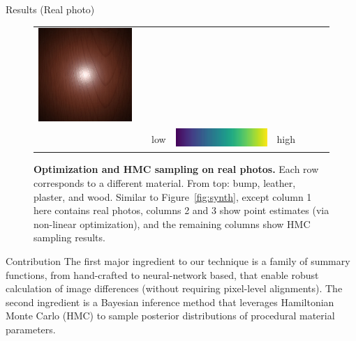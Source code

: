 \documentclass[final]{beamer}
\newlength{\twocolwid}
\newlength{\resultwidth}
\begin{document}
\begin{frame}[t]
\begin{columns}[t]
\begin{column}{\twocolwid}
\begin{block}{Results (Real photo)}
\begin{figure}[t]
\begin{tabular}{ccrclccc}
            		\includegraphics[width=\resultwidth]{images/real/wood/bad1.jpg}
            		\\
            		& & low &
            		\includegraphics[width=\resultwidth]{images/other/colorbar.jpg} &
            		high & & &
            	\end{tabular}
            	\caption{\label{fig:real}
            		\textbf{Optimization and HMC sampling on real photos.}
            		Each row corresponds to a different material. From top: bump, leather, plaster, and wood. Similar to Figure~\protect\ref{fig:synth}, except column 1 here contains real photos, columns 2 and 3 show point estimates (via non-linear optimization), and the remaining columns show HMC sampling results.
            	}
            \end{figure}
        \end{block}

        \begin{block}{Contribution}
            \large{
                The first major ingredient to our technique is a family of summary functions, from hand-crafted to neural-network based, that enable robust calculation of image differences (without requiring pixel-level alignments). The second ingredient is a Bayesian inference method that leverages Hamiltonian Monte Carlo (HMC) to sample posterior distributions of procedural material parameters.
            }
        \end{block}


\end{column}
\end{columns}
\end{frame}
\end{document}
